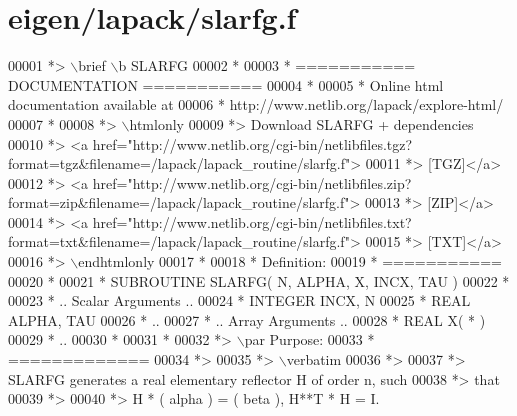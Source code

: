 \hypertarget{eigen_2lapack_2slarfg_8f_source}{}\section{eigen/lapack/slarfg.f}
\label{eigen_2lapack_2slarfg_8f_source}

\begin{DoxyCode}
00001 \textcolor{comment}{*> \(\backslash\)brief \(\backslash\)b SLARFG}
00002 \textcolor{comment}{*}
00003 \textcolor{comment}{*  =========== DOCUMENTATION ===========}
00004 \textcolor{comment}{*}
00005 \textcolor{comment}{* Online html documentation available at }
00006 \textcolor{comment}{*            http://www.netlib.org/lapack/explore-html/ }
00007 \textcolor{comment}{*}
00008 \textcolor{comment}{*> \(\backslash\)htmlonly}
00009 \textcolor{comment}{*> Download SLARFG + dependencies }
00010 \textcolor{comment}{*> <a
       href="http://www.netlib.org/cgi-bin/netlibfiles.tgz?format=tgz&filename=/lapack/lapack\_routine/slarfg.f"> }
00011 \textcolor{comment}{*> [TGZ]</a> }
00012 \textcolor{comment}{*> <a
       href="http://www.netlib.org/cgi-bin/netlibfiles.zip?format=zip&filename=/lapack/lapack\_routine/slarfg.f"> }
00013 \textcolor{comment}{*> [ZIP]</a> }
00014 \textcolor{comment}{*> <a
       href="http://www.netlib.org/cgi-bin/netlibfiles.txt?format=txt&filename=/lapack/lapack\_routine/slarfg.f"> }
00015 \textcolor{comment}{*> [TXT]</a>}
00016 \textcolor{comment}{*> \(\backslash\)endhtmlonly }
00017 \textcolor{comment}{*}
00018 \textcolor{comment}{*  Definition:}
00019 \textcolor{comment}{*  ===========}
00020 \textcolor{comment}{*}
00021 \textcolor{comment}{*       SUBROUTINE SLARFG( N, ALPHA, X, INCX, TAU )}
00022 \textcolor{comment}{* }
00023 \textcolor{comment}{*       .. Scalar Arguments ..}
00024 \textcolor{comment}{*       INTEGER            INCX, N}
00025 \textcolor{comment}{*       REAL               ALPHA, TAU}
00026 \textcolor{comment}{*       ..}
00027 \textcolor{comment}{*       .. Array Arguments ..}
00028 \textcolor{comment}{*       REAL               X( * )}
00029 \textcolor{comment}{*       ..}
00030 \textcolor{comment}{*  }
00031 \textcolor{comment}{*}
00032 \textcolor{comment}{*> \(\backslash\)par Purpose:}
00033 \textcolor{comment}{*  =============}
00034 \textcolor{comment}{*>}
00035 \textcolor{comment}{*> \(\backslash\)verbatim}
00036 \textcolor{comment}{*>}
00037 \textcolor{comment}{*> SLARFG generates a real elementary reflector H of order n, such}
00038 \textcolor{comment}{*> that}
00039 \textcolor{comment}{*>}
00040 \textcolor{comment}{*>       H * ( alpha ) = ( beta ),   H**T * H = I.}

\end{DoxyCode}
